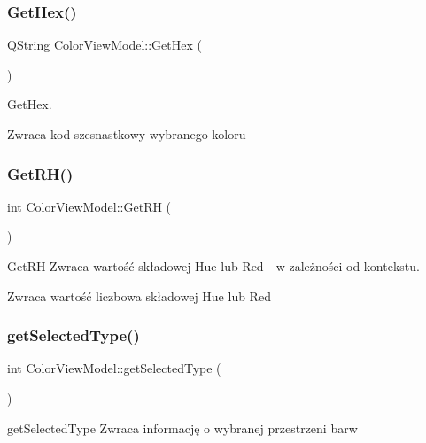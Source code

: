 \subsubsection{\texorpdfstring{Get\+Hex()}{GetHex()}}
{\footnotesize\ttfamily Q\+String Color\+View\+Model\+::\+Get\+Hex (\begin{DoxyParamCaption}{ }\end{DoxyParamCaption})}



Get\+Hex. 

\begin{DoxyReturn}{Zwraca}
kod szesnastkowy wybranego koloru 
\end{DoxyReturn}
\mbox{\label{class_color_view_model_a39724a979609cf96d76a905f313b18c6}} 
\subsubsection{\texorpdfstring{Get\+R\+H()}{GetRH()}}
{\footnotesize\ttfamily int Color\+View\+Model\+::\+Get\+RH (\begin{DoxyParamCaption}{ }\end{DoxyParamCaption})}



Get\+RH Zwraca wartość składowej Hue lub Red -\/ w zależności od kontekstu. 

\begin{DoxyReturn}{Zwraca}
wartość liczbowa składowej Hue lub Red 
\end{DoxyReturn}
\mbox{\label{class_color_view_model_a02a51cd04a027d369275cb29229c44c7}} 
\subsubsection{\texorpdfstring{get\+Selected\+Type()}{getSelectedType()}}
{\footnotesize\ttfamily int Color\+View\+Model\+::get\+Selected\+Type (\begin{DoxyParamCaption}{ }\end{DoxyParamCaption})}



get\+Selected\+Type Zwraca informację o wybranej przestrzeni barw 

